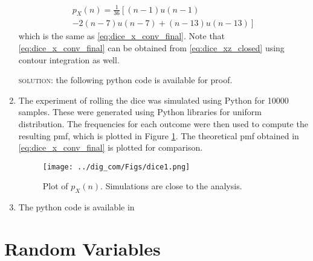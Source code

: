 \documentclass{article}
\numberwithin{equation}{subsection}
\numberwithin{figure}{subsection}
\providecommand{\brak}[1]{\ensuremath{\left(#1\right)}}
\providecommand{\lsbrak}[1]{\ensuremath{{}\left[#1\right.}}
\providecommand{\rsbrak}[1]{\ensuremath{{}\left.#1\right]}}
\renewcommand\thesection{\arabic{section}}
\renewcommand\thesubsection{\thesection.\arabic{subsection}}
\begin{document}
\begin{enumerate}[label=\thesubsection.\arabic*.,ref=\thesubsection.\arabic{figure}]
\begin{multline}
p_{X}(n) = \frac{1}{36}\lsbrak{\brak{n-1}u(n-1) 
}
\\
\rsbrak{- 2 \brak{n-7}u(n-7)+\brak{n-13}u(n-13)}
\end{multline}
which is the same as \eqref{eq:dice_x_conv_final}.  Note that  \eqref{eq:dice_x_conv_final} can be obtained from \eqref{eq:dice_xz_closed} using contour integration as well.
\begin{flushleft}
 \textsc{solution:} the following python code is available for proof.
 \end{flushleft}
  \begin{center}
\end{center}
\item 
The experiment of rolling the dice was simulated using Python for 10000 samples.  These were generated using Python libraries for uniform distribution. The frequencies for each outcome were then used to compute the resulting pmf, which  is plotted in Figure \ref{fig:dice}.  The theoretical pmf obtained in \eqref{eq:dice_x_conv_final} is plotted for comparison.
\begin{figure}[!ht]
\centering
\texttt{[image: ../dig\_com/Figs/dice1.png]} 
\caption{Plot of $p_X(n)$.  Simulations are close to the analysis. }
\label{fig:dice}
\end{figure}
\item The python code is available in 
\begin{center}
\end{center}
\end{enumerate}
\section{Random Variables}
\end{document}
